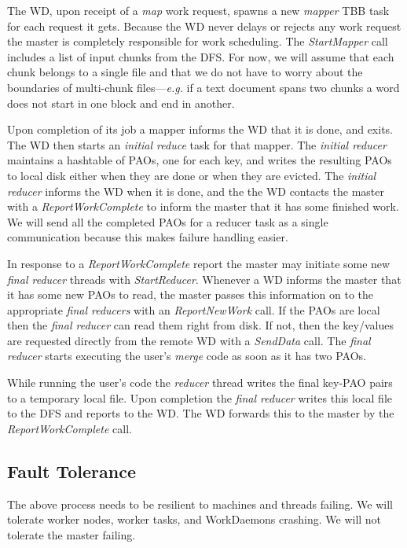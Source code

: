 \documentclass[10pt,letter,final,article,twocolumn]{article} %
\newcommand{\rpc}[1]{\emph{#1}}
\begin{document}
The WD, upon receipt of a \emph{map} work request, spawns a new \emph{mapper} TBB task for each request it gets. Because the WD never delays or rejects any work request the master is completely responsible for work scheduling. The  \rpc{StartMapper} call includes a list of input chunks from the DFS. For now, we will assume that each chunk belongs to a single file and that we do not have to worry about the boundaries of multi-chunk files---\textit{e.g.} if a text document spans two chunks a word does not start in one block and end in another.

Upon completion of its job a mapper informs the WD that it is done, and exits. The WD then starts an \emph{initial reduce} task for that mapper. The \emph{initial reducer} maintains a hashtable of PAOs, one for each key, and writes the resulting PAOs to local disk either when they are done or when they are evicted. The \emph{initial reducer} informs the WD when it is done, and the the WD contacts the master with a \rpc{ReportWorkComplete} to inform the master that it has some finished work. We will send all the completed PAOs for a reducer task as a single communication because this makes failure handling easier.

In response to a \rpc{ReportWorkComplete} report the master may initiate some new \emph{final reducer} threads with \rpc{StartReducer}. Whenever a WD informs the master that it has some new PAOs to read, the master passes this information on to the appropriate \emph{final reducers} with an \rpc{ReportNewWork} call. If the PAOs  are local then the \emph{final reducer} can read them right from disk. If not, then the key/values are requested directly from the remote WD with a \rpc{SendData} call. The \emph{final reducer} starts executing the user's \emph{merge} code as soon as it has two PAOs.

While running the user's code the \emph{reducer} thread writes the final key-PAO pairs to a temporary local file. Upon completion the \emph{final reducer} writes this local file to the DFS and reports to the WD. The WD forwards this to the master by the \rpc{ReportWorkComplete} call.

\subsection{Fault Tolerance}
The above process needs to be resilient to machines and threads failing. We will tolerate worker nodes, worker tasks, and WorkDaemons crashing. We will not tolerate the master failing.
\end{document}
